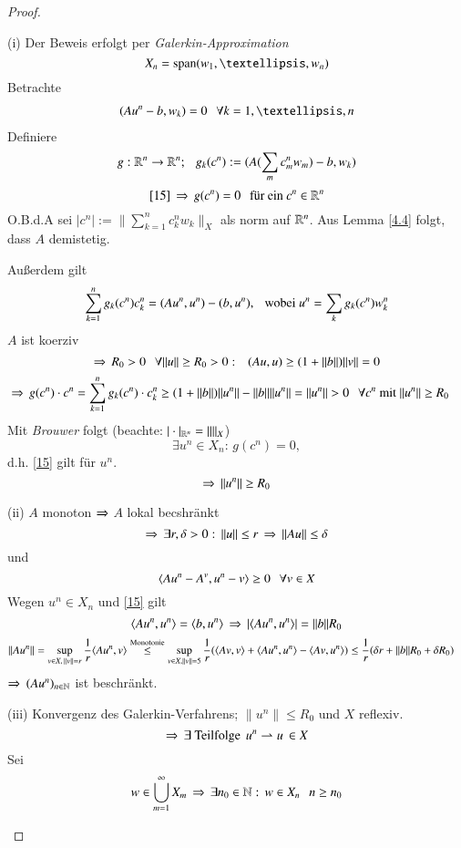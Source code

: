 \begin{proof}
    \begin{description}
    \item{(i)}
    Der Beweis erfolgt per \textit{Galerkin-Approximation}
    \[
        X_n=\mr{span}(w_1,…,w_n)
    \]
    Betrachte
    \begin{align}\label{15}
        (Au^n-b,w_k)=0 \qq \forall k=1,…,n
    \end{align}
    Definiere
    \[
        g:\mathbb{R}^n\rightarrow \mathbb{R}^n; \hspace{.25cm} g_k(c^n):= (A(\sum_mc_m^nw_m)-b,w_k)
    \]
    \[
        \ref{15} \, \Rightarrow \, g(c^n)=0 \hspace{.25cm} \text{für ein } c^n\in\mathbb{R}^n  
    \]
    O.B.d.A sei $|c^n|:= \|\sum_{k=1}^n c^n_kw_k\|_X$ als norm auf $\mathbb{R}^n$. Aus Lemma \ref{4.4} folgt,
    dass $A$ demistetig. 

    Außerdem gilt
    \[
        \sum_{k=1}^n g_k(c^n)c^n_k=(Au^n,u^n)-(b,u^n), \hspace{.25cm} \text{wobei } u^n=\sum_kg_k(c^n)w_k^n
    \]
    $A$ ist koerziv
    \[
        \Rightarrow \, R_0>0 \hspace{.25cm} \forall \|u\|\geq R_0>0: \hspace{.25cm} (Au,u)\geq (1+\|b\|)\|v\| =0
    \]
    \begin{align*}
        \Ra \, g(c^n)\cdot c^n &= \sum_{k=1}^ng_k(c^n)\cdot c_k^n \geq (1+\|b\|)\|u^n\| - \|b\|\|u^n\|
        =\|u^n\|>0 \qq \forall c^n \text{ mit } \|u^n\|\geq R_0
    \end{align*}
    Mit \textit{Brouwer} folgt (beachte: $|\cdot|_{\mathbb{R}^n}=\|\|_X$)
    \[
        \exists u^n\in X_n: \, g(c^n)=0,
    \]
    d.h. \ref{15} gilt für $u^n$.
    \[
        \Rightarrow \, \|u^n\|\geq R_0
    \]
    \item{(ii)}
    $A$ monoton $\Rightarrow$ $A$ lokal becshränkt
    \[
        \Rightarrow \, \exists r,\delta>0: \, \|u\|\leq r \, \Rightarrow \, \|Au\|\leq \delta
    \]
    und
    \[
        \langle Au^n-A^v,u^n-v\rangle\geq 0 \hspace{.25cm} \forall v\in X
    \]
    Wegen $u^n\in X_n$ und \ref{15} gilt
    \[
        \langle Au^n,u^n\rangle=\langle b,u^n\rangle\, \Rightarrow \, |\langle Au^n,u^n\rangle|=\|b\|R_0
    \]
    \begin{align*}
        \|Au^n\|&= \sup_{v\in X, \, \|v\|=r} \frac1r\langle Au^n,v\rangle \overset{\text{Monotonie}}{\leq} 
        \sup_{v\in X, \|v\|=5} \frac1r (\langle Av,v\rangle+\langle Au^n,u^n\rangle-\langle Av,u^n\rangle)
        \leq \frac1r (\delta r+ \|b\|R_0 +\delta R_0)
    \end{align*}
    $\Rightarrow $ $(Au^n)_{n\in \mathbb{N}}$ ist beschränkt.
    \item{(iii)}
    Konvergenz des Galerkin-Verfahrens; $\|u^n\|\leq R_0$ und $X$ reflexiv.
    \[
        \Rightarrow \, \exists \text{ Teilfolge } \, u^n\rightharpoonup u \,\in X
    \]
    Sei 
    \[
        w\in \bigcup_{m=1}^\infty X_m \, \Rightarrow \, \exists n_0\in\mathbb{N}: \, w\in X_n\hspace{.25cm} n\geq n_0
\]
\end{description}
\end{proof}

